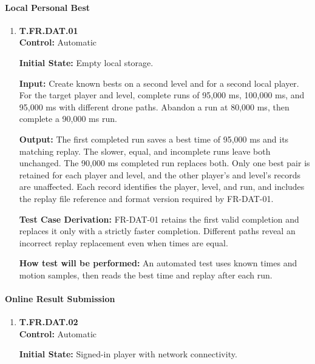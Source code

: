 \documentclass[12pt, titlepage]{article}
\begin{document}
{\sloppy
\paragraph{Local Personal Best}

\begin{enumerate}

\item{\hypertarget{test-fr-da01}{}\textbf{T.FR.DAT.01}\\}
\textbf{Control:} Automatic

\textbf{Initial State:} Empty local storage.

\textbf{Input:} Create known bests on a second level and for a second local player.
For the target player and level, complete runs of 95,000 ms, 100,000 ms,
and 95,000 ms with different drone paths. Abandon a run at 80,000 ms, then complete
a 90,000 ms run.

\textbf{Output:} The first completed run saves a best time of 95,000 ms and its
matching replay. The slower, equal, and incomplete runs leave both unchanged.
The 90,000 ms completed run replaces both. Only one best pair is retained for each
player and level, and the other player's and level's records are unaffected. Each
record identifies the player, level, and run, and includes the replay file reference
and format version required by \mbox{FR-DAT-01}.

\textbf{Test Case Derivation:} \mbox{FR-DAT-01} retains the first valid completion
and replaces it only with a strictly faster completion. Different paths reveal an
incorrect replay replacement even when times are equal.

\textbf{How test will be performed:} An automated test uses known times and motion
samples, then reads the best time and replay after each run.

\end{enumerate}

\paragraph{Online Result Submission}

\begin{enumerate}

\item{\hypertarget{test-fr-da02}{}\textbf{T.FR.DAT.02}\\}
\textbf{Control:} Automatic

\textbf{Initial State:} Signed-in player with network connectivity.


\end{enumerate}}
\end{document}
